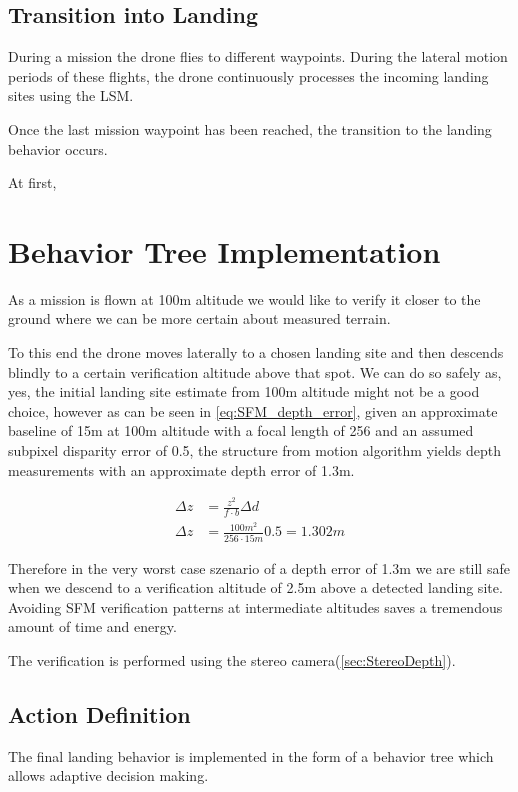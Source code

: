\subsection{Transition into Landing}

During a mission the drone flies to different waypoints. During the lateral motion periods of these flights, the drone continuously processes the incoming landing sites using the LSM.

Once the last mission waypoint has been reached, the transition to the landing behavior occurs.

At first, 

\section{Behavior Tree Implementation}\label{subsec:behavior_tree}

As a mission is flown at 100m altitude we would like to verify it closer to the ground where we can be more certain about measured terrain.

To this end the drone moves laterally to a chosen landing site and then descends blindly to a certain verification altitude above that spot. We can do so safely as, yes, the initial landing site estimate from 100m altitude might not be a good choice, however as can be seen in \cref{eq:SFM_depth_error}, given an approximate baseline of 15m at 100m altitude with a focal length of 256 and an assumed subpixel disparity error of 0.5, the structure from motion algorithm yields depth measurements with an approximate depth error of 1.3m.

\begin{align}
    {\Delta z} &= \frac{z^2}{f  \cdot b}\Delta d\\
    {\Delta z} &= \frac{100m^2}{256  \cdot 15m}0.5 = 1.302m
    \label{eq:SFM_depth_error}
\end{align}

Therefore in the very worst case szenario of a depth error of 1.3m we are still safe when we descend to a verification altitude of 2.5m above a detected landing site. Avoiding SFM verification patterns at intermediate altitudes saves a tremendous amount of time and energy.

The verification is performed using the stereo camera(\ref{sec:StereoDepth}).



\subsection{Action Definition}
The final landing behavior is implemented in the form of a behavior tree which allows adaptive decision making.

